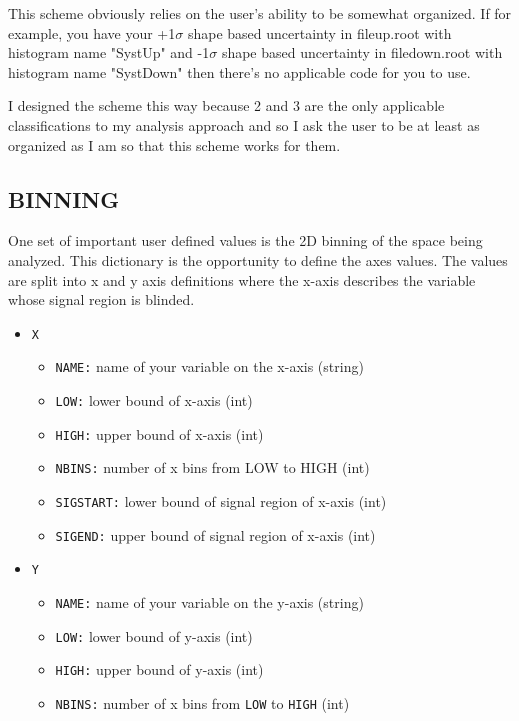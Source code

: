 \documentclass[letter]{article}
\begin{document}
	This scheme obviously relies on the user's ability to be somewhat organized. If for example, you have your +1$\sigma$ shape based uncertainty in file\textunderscore up.root with histogram name "SystUp" and -1$\sigma$ shape based uncertainty in file\textunderscore down.root with histogram name "SystDown" then there's no applicable code for you to use. 

	I designed the scheme this way because 2 and 3 are the only applicable classifications to my analysis approach and so I ask the user to be at least as organized as I am so that this scheme works for them.

	\subsection{BINNING}
	One set of important user defined values is the 2D binning of the space being analyzed. This dictionary is the opportunity to define the axes values. The values are split into x and y axis definitions where the x-axis describes the variable whose signal region is blinded.
	\begin{itemize}
		\item \verb"X"
		\begin{itemize}
			\item \verb"NAME:" name of your variable on the x-axis (string)
			\item \verb"LOW:" lower bound of x-axis (int)
			\item \verb"HIGH:" upper bound of x-axis (int)
			\item \verb"NBINS:" number of x bins from LOW to HIGH (int)
			\item \verb"SIGSTART:" lower bound of signal region of x-axis (int)
			\item \verb"SIGEND:" upper bound of signal region of x-axis (int)
		\end{itemize}
		\item \verb"Y"
		\begin{itemize}
			\item \verb"NAME:" name of your variable on the y-axis (string)
			\item \verb"LOW:" lower bound of y-axis (int)
			\item \verb"HIGH:" upper bound of y-axis (int)
			\item \verb"NBINS:" number of x bins from \verb"LOW" to \verb"HIGH" (int)
		\end{itemize}
	\end{itemize}
\end{document}
